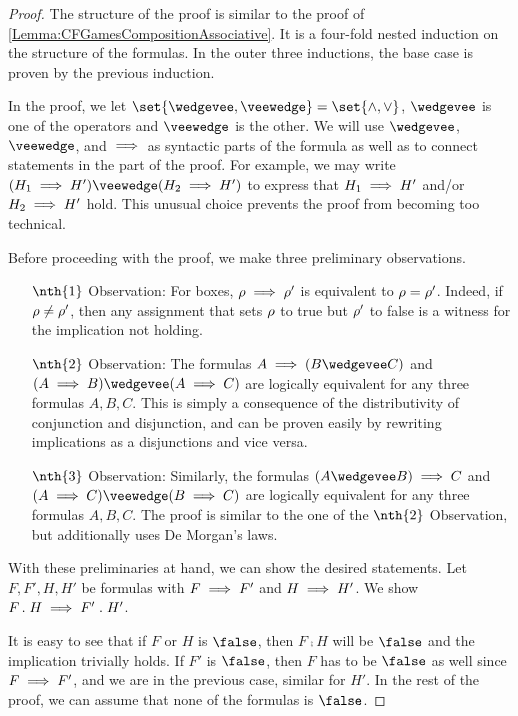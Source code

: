\documentclass[../../diss.tex]{subfiles}
\begin{document}
\begin{proof}
    The structure of the proof is similar to the proof of \cref{Lemma:CFGamesCompositionAssociative}.
    It is a four-fold nested induction on the structure of the formulas.
    In the outer three inductions, the base case is proven by the previous induction.

    In the proof, we let $\set{ \wedgevee, \veewedge } = \set{ \wedge, \vee}$, \ie $\wedgevee$ is one of the operators and $\veewedge$ is the other.
    We will use $\wedgevee$, $\veewedge$, and $\implies$ as syntactic parts of the formula as well as to connect statements in the part of the proof.
    For example, we may write $(H_1 \lleq H') \veewedge (H_2 \lleq H')$ to express that $H_1 \implies H'$ and/or $H_2 \implies H'$ hold.
    This unusual choice prevents the proof from becoming too technical.

    Before proceeding with the proof, we make three preliminary observations.
    \begin{itemize}
        \item[$\nth{1}$ Observation:]
            For boxes, $\tbox \lleq \tbox'$ is equivalent to $\tbox = \tbox'$.
            Indeed, if $\tbox \neq \tbox'$, then any assignment that sets $\tbox$ to true but $\tbox'$ to false is a witness for the implication not holding.
        \item[$\nth{2}$ Observation:]
            The formulas $A \lleq (B \wedgevee C)$ and  $(A \lleq B) \wedgevee (A \lleq C)$ are logically equivalent for any three formulas $A,B,C$.
            This is simply a consequence of the distributivity of conjunction and disjunction, and can be proven easily by rewriting implications as a disjunctions and vice versa.
        \item[$\nth{3}$ Observation:]
            Similarly, the formulas  $(A \wedgevee B) \lleq C$ and $(A \lleq C) \veewedge (B \lleq C)$ are logically equivalent for any three formulas $A,B,C$.
            The proof is similar to the one of the $\nth{2}$ Observation, but additionally uses De Morgan's laws.
    \end{itemize}

    With these preliminaries at hand, we can show the desired statements.
    Let $F,F',H,H'$ be formulas with $F \implies F'$ and $H \implies H'$.
    We show $F \mathrel{.} H \implies F' \mathrel{.} H'$.

    It is easy to see that if $F$ or $H$ is $\false$, then $F \comp H$ will be $\false$ and the implication trivially holds.
    If $F'$ is $\false$, then $F$ has to be $\false$ as well since $F \implies F'$, and we are in the previous case, similar for $H'$.
    In the rest of the proof, we can assume that none of the formulas is $\false$.


\end{proof}
\end{document}
